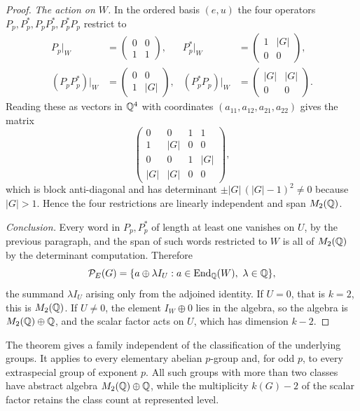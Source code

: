 \begin{proof}
\emph{The action on \(W\).}  In the ordered basis \((e,u)\) the four
operators \(P_p,P_p^*,P_pP_p^*,P_p^*P_p\) restrict to
\begin{equation}
 \begin{aligned}
 P_p|_W&=
 \begin{pmatrix}0&0\\1&1\end{pmatrix},
 & P_p^*|_W&=
 \begin{pmatrix}1&|G|\\0&0\end{pmatrix},\\
 (P_pP_p^*)|_W&=
 \begin{pmatrix}0&0\\1&|G|\end{pmatrix},
 & (P_p^*P_p)|_W&=
 \begin{pmatrix}|G|&|G|\\0&0\end{pmatrix}.
 \end{aligned}
 \label{eq:prime-two-by-two}
\end{equation}
Reading these as vectors in \(\mathbb Q^4\) with coordinates
\((a_{11},a_{12},a_{21},a_{22})\) gives the matrix
\[
 \begin{pmatrix}
 0&0&1&1\\
 1&|G|&0&0\\
 0&0&1&|G|\\
 |G|&|G|&0&0
 \end{pmatrix},
\]
which is block anti-diagonal and has determinant
\(\pm|G|\,(|G|-1)^2\neq0\) because \(|G|>1\).  Hence the
four restrictions are linearly independent and span \(M_2(\mathbb Q)\).

\emph{Conclusion.}  Every word in \(P_p,P_p^*\) of length at least one
vanishes on \(U\), by the previous paragraph, and the span of such words
restricted to \(W\) is all of \(M_2(\mathbb Q)\) by the determinant computation.
Therefore
\[
 \mathcal P_E(G)
 =\{a\oplus\lambda I_U:a\in\operatorname{End}_\mathbb Q(W),\ \lambda\in\mathbb Q\},
\]
the summand \(\lambda I_U\) arising only from the adjoined identity.  If
\(U=0\), that is \(k=2\), this is \(M_2(\mathbb Q)\).  If \(U\neq0\), the element
\(I_W\oplus0\) lies in the algebra, so the algebra is
\(M_2(\mathbb Q)\oplus\mathbb Q\), and the scalar factor acts on \(U\), which has
dimension \(k-2\).
\end{proof}

The theorem gives a family independent of the
classification of the underlying groups.  It applies to every elementary
abelian \(p\)-group and, for odd \(p\), to every extraspecial group of
exponent \(p\).  All such groups with more than two classes have abstract
algebra \(M_2(\mathbb Q)\oplus\mathbb Q\), while the multiplicity \(k(G)-2\) of the scalar
factor retains the class count at represented level.

